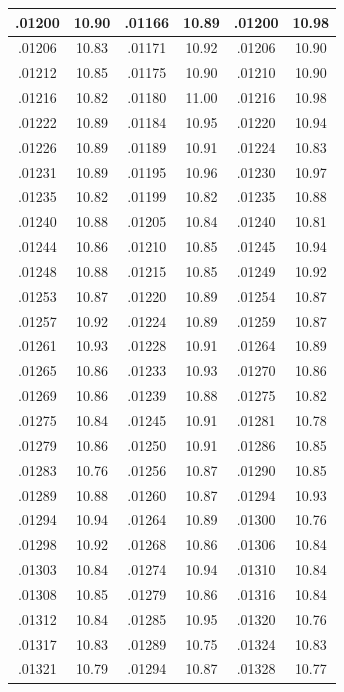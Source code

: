 \documentclass[10pt,twoside]{report}
\begin{document}
\begin{appendices}
\begin{longtable}{|c|c||c|c||c|c|}
.01200 & 10.90 & .01166 & 10.89 & .01200 & 10.98\\\hline
.01206 & 10.83 & .01171 & 10.92 & .01206 & 10.90\\\hline
.01212 & 10.85 & .01175 & 10.90 & .01210 & 10.90\\\hline
.01216 & 10.82 & .01180 & 11.00 & .01216 & 10.98\\\hline
.01222 & 10.89 & .01184 & 10.95 & .01220 & 10.94\\\hline
.01226 & 10.89 & .01189 & 10.91 & .01224 & 10.83\\\hline
.01231 & 10.89 & .01195 & 10.96 & .01230 & 10.97\\\hline
.01235 & 10.82 & .01199 & 10.82 & .01235 & 10.88\\\hline
.01240 & 10.88 & .01205 & 10.84 & .01240 & 10.81\\\hline
.01244 & 10.86 & .01210 & 10.85 & .01245 & 10.94\\\hline
.01248 & 10.88 & .01215 & 10.85 & .01249 & 10.92\\\hline
.01253 & 10.87 & .01220 & 10.89 & .01254 & 10.87\\\hline
.01257 & 10.92 & .01224 & 10.89 & .01259 & 10.87\\\hline
.01261 & 10.93 & .01228 & 10.91 & .01264 & 10.89\\\hline
.01265 & 10.86 & .01233 & 10.93 & .01270 & 10.86\\\hline
.01269 & 10.86 & .01239 & 10.88 & .01275 & 10.82\\\hline
.01275 & 10.84 & .01245 & 10.91 & .01281 & 10.78\\\hline
.01279 & 10.86 & .01250 & 10.91 & .01286 & 10.85\\\hline
.01283 & 10.76 & .01256 & 10.87 & .01290 & 10.85\\\hline
.01289 & 10.88 & .01260 & 10.87 & .01294 & 10.93\\\hline
.01294 & 10.94 & .01264 & 10.89 & .01300 & 10.76\\\hline
.01298 & 10.92 & .01268 & 10.86 & .01306 & 10.84\\\hline
.01303 & 10.84 & .01274 & 10.94 & .01310 & 10.84\\\hline
.01308 & 10.85 & .01279 & 10.86 & .01316 & 10.84\\\hline
.01312 & 10.84 & .01285 & 10.95 & .01320 & 10.76\\\hline
.01317 & 10.83 & .01289 & 10.75 & .01324 & 10.83\\\hline
.01321 & 10.79 & .01294 & 10.87 & .01328 & 10.77\\\hline

\end{longtable}
\end{appendices}
\end{document}
